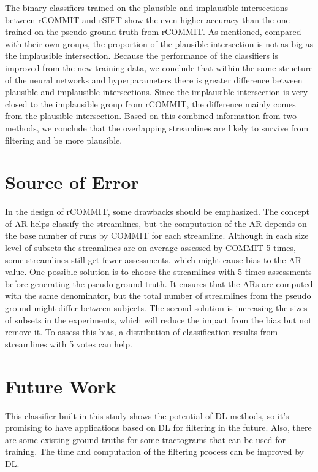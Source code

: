 The binary classifiers trained on the plausible and implausible intersections between rCOMMIT and rSIFT show the even higher accuracy than
the one trained on the pseudo ground truth from rCOMMIT. As mentioned, compared with their own groups, the proportion of the plausible intersection is not as big as the 
implausible intersection. Because the performance of the classifiers is improved from the new training data, we conclude that within the same
structure of the neural networks and hyperparameters there is greater difference between plausible and implausible intersections.
Since the implausible intersection is very closed to the implausible group from rCOMMIT, the difference mainly comes from the plausible intersection.
Based on this combined information from two methods, we conclude that the overlapping streamlines are likely to survive from filtering and be more plausible.



\section{Source of Error}

In the design of rCOMMIT, some drawbacks should be emphasized. The concept of AR helps classify the streamlines, but the 
computation of the AR depends on the base number of runs by COMMIT for each streamline. 
Although in each size level of subsets the streamlines are on average assessed by COMMIT 5 times, some streamlines still get fewer assessments,
which might cause bias to the AR value. One possible solution is to choose the streamlines with 5 times assessments before
generating the pseudo ground truth. It ensures that the ARs are computed with the same denominator, 
but the total number of streamlines from the pseudo ground might differ between subjects.
The second solution is increasing the sizes of subsets in the experiments, which will reduce the impact from the bias but not remove it.
To assess this bias, a distribution of classification results from streamlines with 5 votes can help.




\section{Future Work}

This classifier built in this study shows the potential of DL methods, so it's promising to have applications 
based on DL for filtering in the future. Also, there are some existing ground truths for some tractograms that 
can be used for training. The time and computation of the filtering process can be improved by DL.   

